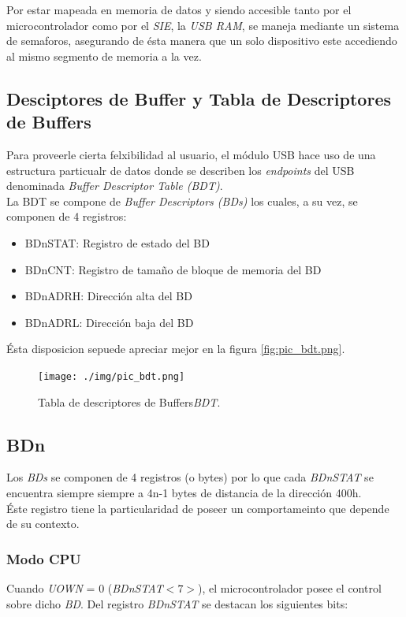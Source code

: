 Por estar mapeada en memoria de datos y siendo accesible tanto por el
microcontrolador como por el \emph{SIE}, la \emph{USB RAM}, se maneja mediante
un sistema de semaforos, asegurando de \'esta manera que un solo dispositivo
este accediendo al mismo segmento de memoria a la vez.

\subsection{Desciptores de Buffer y Tabla de Descriptores de Buffers}
Para proveerle cierta felxibilidad al usuario, el m\'odulo USB hace uso de
una estructura particualr de datos donde se describen los \emph{endpoints} del
USB denominada \emph{Buffer Descriptor Table (BDT)}. \\

La BDT se compone de \emph{Buffer Descriptors (BDs)} los cuales, a su vez, se
componen de 4 registros:

\begin{itemize}
 \item BDnSTAT: Registro de estado del BD

 \item BDnCNT:  Registro de tama\~no de bloque de memoria del BD

 \item BDnADRH: Direcci\'on alta del BD

 \item BDnADRL: Direcci\'on baja del BD
\end{itemize}

\'Esta disposicion sepuede apreciar mejor en la figura \ref{fig:pic_bdt.png}.

\begin{figure}
\centering
\texttt{[image: ./img/pic\_bdt.png]}
\caption{Tabla de descriptores de Buffers\emph{BDT}.}
\label{fig:pic_bdt}
\end{figure}

\subsection{BDn}
Los \emph{BDs} se componen de 4 registros (o bytes) por lo que cada
\emph{BDnSTAT} se encuentra siempre siempre a 4n-1 bytes de distancia de la
direcci\'on 400h.\\

\'Este registro tiene la particularidad de poseer un comportameinto que
depende de su contexto.

\subsubsection{Modo CPU}
Cuando \emph{UOWN} = 0 (\emph{BDnSTAT$<7>$}), el microcontrolador posee el
control sobre dicho \emph{BD}. Del registro \emph{BDnSTAT} se destacan los
siguientes bits:

